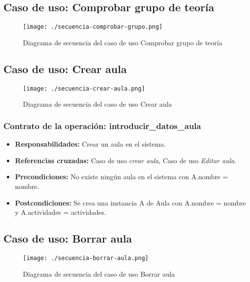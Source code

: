 \subsection{Caso de uso: Comprobar grupo de teoría}
\begin{figure}[H] 
  \label{comportamiento-comprobar-grupo} 
	\begin{center}
    \texttt{[image: ./secuencia-comprobar-grupo.png]}
  \end{center}
\caption{Diagrama de secuencia del caso de uso Comprobar grupo de teoría}
\end{figure}

\subsection{Caso de uso: Crear aula}

\begin{figure}[H] 
  \label{comportamiento-crear-aula} 
	\begin{center}
    \texttt{[image: ./secuencia-crear-aula.png]}
  \end{center}
\caption{Diagrama de secuencia del caso de uso Crear aula}
\end{figure}

\subsubsection{Contrato de la operación: introducir\_datos\_aula}
\begin{itemize}
\item {\bf Responsabilidades:} Crear un aula en el sistema.
\item {\bf Referencias cruzadas:} Caso de uso {\em crear aula}, Caso de uso {\em Editar aula}.
\item {\bf Precondiciones:} No existe ningún aula en el sistema con A.nombre = nombre.
\item {\bf Postcondiciones:} Se crea una instancia A de Aula con A.nombre = nombre y A.actividades = actividades.
\end{itemize}

\subsection{Caso de uso: Borrar aula}
\begin{figure}[H] 
  \label{comportamiento-borrar-aula} 
	\begin{center}
    \texttt{[image: ./secuencia-borrar-aula.png]}
  \end{center}
\caption{Diagrama de secuencia del caso de uso Borrar aula}
\end{figure}

